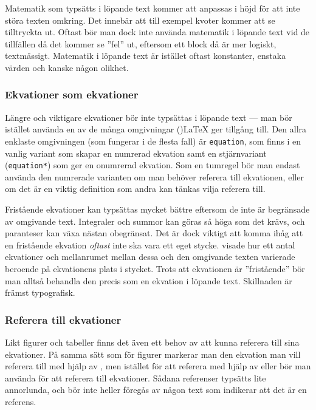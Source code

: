 \documentclass[lang=sv,ptsize=10pt,font=none,nomath,titles=bf,../../a4.tex]{subfiles}
\begin{document}
Matematik som typsätts i löpande text kommer att anpassas i höjd för att
inte störa texten omkring. Det innebär att till exempel kvoter kommer att
se tilltryckta ut. Oftast bör man dock inte använda matematik i löpande
text vid de tillfällen då det kommer se ”fel” ut, eftersom ett block då
är mer logiskt, textmässigt. Matematik i löpande text är istället oftast
konstanter, enstaka värden och kanske någon olikhet.

\subsubsection{Ekvationer som ekvationer}\label{sec:3:ekvsomekv}
Längre och viktigare ekvationer bör inte typsättas i löpande text —
man bör istället använda en av de många omgivningar (\AmS)\LaTeX{} ger
tillgång till. Den allra enklaste omgivningen (som fungerar i de flesta
fall) är \texttt{equation}, som finns i en vanlig variant som skapar 
en numrerad ekvation samt en stjärnvariant (\texttt{equation*}) som ger en
onumrerad ekvation. Som en tumregel bör man endast använda den numrerade
varianten om man behöver referera till ekvationen, eller om det är en
viktig definition som andra kan tänkas vilja referera till.

Fristående ekvationer kan typsättas mycket bättre eftersom de inte är 
begränsade av omgivande text. Integraler och summor kan göras så höga som
det krävs, och paranteser kan växa nästan obegränsat. Det är dock viktigt
att komma ihåg att en fristående ekvation \emph{oftast} inte ska vara ett 
eget
stycke.  visade hur ett antal ekvationer och
mellanrumet mellan dessa och den omgivande texten varierade beroende på
	ekvationens plats i stycket. Trots att ekvationen är ”fristående” bör
	man alltså behandla den precis som en
ekvation i löpande text. Skillnaden är främst typografisk.

\subsubsection{Referera till ekvationer}
Likt figurer och tabeller finns det även ett behov av att kunna referera
till sina ekvationer. På samma sätt som för figurer markerar man den
ekvation man vill referera till med hjälp av , men istället
för att referera med hjälp av  eller  bör man använda
 för att referera till ekvationer. Sådana referenser typsätts
lite annorlunda, och bör inte heller föregås av någon text som indikerar
att det är en referens.
\end{document}
